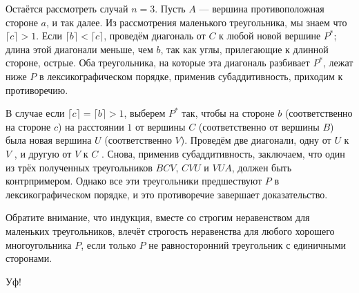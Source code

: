 Остаётся рассмотреть случай $n=3$.
Пусть $A$ --- вершина противоположная стороне $a$, и так далее.
Из рассмотрения маленького треугольника, мы знаем что $\lceil c\rceil>1$.
Если $\lceil b\rceil<\lceil c\rceil$, проведём диагональ от $C$ к любой новой вершине $P^*$;
длина этой диагонали меньше, чем $b$, так как углы, прилегающие к длинной стороне, острые.
Оба треугольника, на которые эта диагональ разбивает $P^*$, лежат ниже $P$ в лексикографическом порядке, применив субаддитивность, приходим к противоречию.

В случае если $\lceil c\rceil=\lceil b\rceil>1$, выберем $P^*$ так, чтобы на стороне $b$ (соответственно на стороне $c$) на расстоянии $1$ от вершины $C$ (соответственно от вершины $B$) была новая вершина $U$ (соответственно $V$).
Проведём две диагонали, одну от $U$ к $V$%
, и другую от $V$ к $C$%
.
Снова, применив субаддитивность, заключаем, что один из трёх полученных треугольников $BCV$, $CVU$ и $VUA$, должен быть контрпримером.
Однако все эти треугольники предшествуют $P$ в лексикографическом порядке, и это противоречие завершает доказательство.

Обратите внимание, что индукция, вместе со строгим неравенством для маленьких треугольников, влечёт строгость неравенства для любого хорошего многоугольника $P$, если только $P$ не равносторонний треугольник с единичными сторонами.

Уф!
